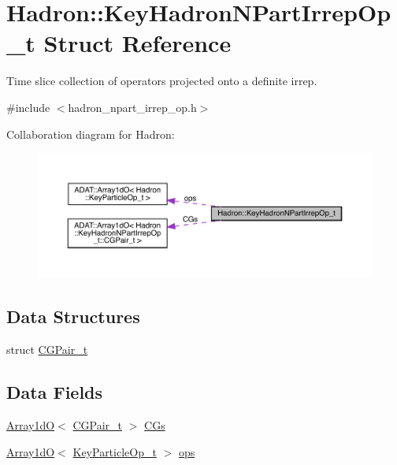 \hypertarget{structHadron_1_1KeyHadronNPartIrrepOp__t}{}\section{Hadron\+:\+:Key\+Hadron\+N\+Part\+Irrep\+Op\+\_\+t Struct Reference}
\label{structHadron_1_1KeyHadronNPartIrrepOp__t}


Time slice collection of operators projected onto a definite irrep.  




{\ttfamily \#include $<$hadron\+\_\+npart\+\_\+irrep\+\_\+op.\+h$>$}



Collaboration diagram for Hadron\+:\nopagebreak
\begin{figure}[H]
\begin{center}
\leavevmode
\includegraphics[width=350pt]{dd/d5c/structHadron_1_1KeyHadronNPartIrrepOp__t__coll__graph}
\end{center}
\end{figure}
\subsection*{Data Structures}
\begin{DoxyCompactItemize}
\item 
struct \mbox{\hyperlink{structHadron_1_1KeyHadronNPartIrrepOp__t_1_1CGPair__t}{C\+G\+Pair\+\_\+t}}
\end{DoxyCompactItemize}
\subsection*{Data Fields}
\begin{DoxyCompactItemize}
\item 
\mbox{\hyperlink{classADAT_1_1Array1dO}{Array1dO}}$<$ \mbox{\hyperlink{structHadron_1_1KeyHadronNPartIrrepOp__t_1_1CGPair__t}{C\+G\+Pair\+\_\+t}} $>$ \mbox{\hyperlink{structHadron_1_1KeyHadronNPartIrrepOp__t_ad578b34132c3bac4ce6145520e4e878d}{C\+Gs}}
\item 
\mbox{\hyperlink{classADAT_1_1Array1dO}{Array1dO}}$<$ \mbox{\hyperlink{structHadron_1_1KeyParticleOp__t}{Key\+Particle\+Op\+\_\+t}} $>$ \mbox{\hyperlink{structHadron_1_1KeyHadronNPartIrrepOp__t_a7784c45d582e672b8ade01f544e85cfe}{ops}}
\end{DoxyCompactItemize}


